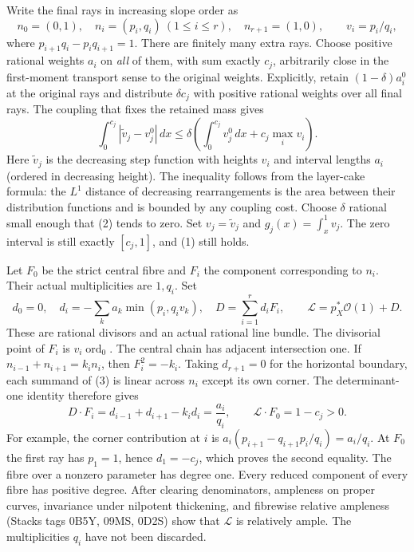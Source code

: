 \documentclass[11pt]{article}
\begin{document}
Write the final rays in increasing slope order as
\[
 n_0=(0,1),\quad n_i=(p_i,q_i)\ (1\le i\le r),
 \quad n_{r+1}=(1,0),\qquad v_i=p_i/q_i,
\]
where $p_{i+1}q_i-p_iq_{i+1}=1$.
There are finitely many extra rays. Choose positive rational weights
$a_i$ on \emph{all} of them, with sum exactly $c_j$, arbitrarily close
in the first-moment transport sense to the original weights.
Explicitly, retain $(1-\delta)a_i^0$ at the original rays and distribute
$\delta c_j$ with positive rational weights over all final rays.
The coupling that fixes the retained mass gives
\[
 \int_0^{c_j}|\widetilde v_j-v_j^0|\,dx
 \le\delta\left(\int_0^{c_j}v_j^0\,dx
                    +c_j\max_i v_i\right).              \tag{2}
\]
Here $\widetilde v_j$ is the decreasing step function with heights
$v_i$ and interval lengths $a_i$ (ordered in decreasing height).
The inequality follows from the layer-cake formula: the $L^1$
distance of decreasing rearrangements is the area between their
distribution functions and is bounded by any coupling cost.
Choose $\delta$ rational small enough that (2) tends to zero.
Set $v_j=\widetilde v_j$ and $g_j(x)=\int_x^1v_j$. The zero interval
is still exactly $[c_j,1]$, and (1) still holds.

Let $F_0$ be the strict central fibre and $F_i$ the component
corresponding to $n_i$. Their actual multiplicities are $1,q_i$.
Set
\[
 d_0=0,\quad
 d_i=-\sum_k a_k\min(p_i,q_i v_k),\quad
 D=\sum_{i=1}^r d_iF_i,\qquad
 \mathcal L=p_X^*\mathcal O(1)+D.                         \tag{3}
\]
These are rational divisors and an actual rational line bundle.
The divisorial point of $F_i$ is $v_i\operatorname{ord}_0$.
The central chain has adjacent intersection one. If
$n_{i-1}+n_{i+1}=k_i n_i$, then $F_i^2=-k_i$.
Taking $d_{r+1}=0$ for the horizontal boundary, each summand of (3)
is linear across $n_i$ except its own corner. The determinant-one
identity therefore gives
\[
 D\cdot F_i=d_{i-1}+d_{i+1}-k_i d_i=\frac{a_i}{q_i},
 \qquad \mathcal L\cdot F_0=1-c_j>0.                     \tag{4}
\]
For example, the corner contribution at $i$ is
$a_i(p_{i+1}-q_{i+1}p_i/q_i)=a_i/q_i$.
At $F_0$ the first ray has $p_1=1$, hence $d_1=-c_j$,
which proves the second equality. The fibre over a nonzero parameter
has degree one. Every reduced component of every fibre has positive
degree. After clearing denominators, ampleness on proper curves,
invariance under nilpotent thickening, and fibrewise relative
ampleness (Stacks tags 0B5Y, 09MS, 0D2S) show that $\mathcal L$ is
relatively ample. The multiplicities $q_i$ have not been discarded.
\end{document}
